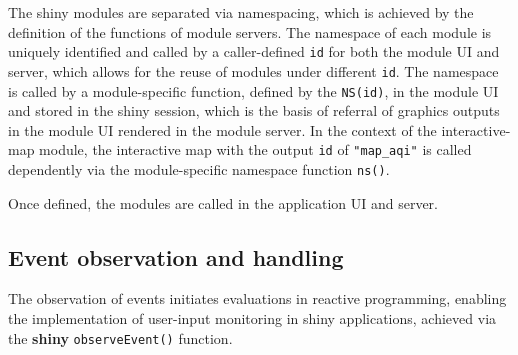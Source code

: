 \documentclass{aucklandthesis}
\begin{document}
The shiny modules are separated via namespacing, which is achieved by the definition of the functions of module servers. The namespace of each module is uniquely identified and called by a caller-defined \texttt{id} for both the module UI and server, which allows for the reuse of modules under different \texttt{id}. The namespace is called by a module-specific function, defined by the \texttt{NS(id)}, in the module UI and stored in the shiny session, which is the basis of referral of graphics outputs in the module UI rendered in the module server. In the context of the interactive-map module, the interactive map with the output \texttt{id} of \texttt{"map\_aqi"} is called dependently via the module-specific namespace function \texttt{ns()}.

Once defined, the modules are called in the application UI and server.

\begin{Shaded}
\begin{Highlighting}[]
\StringTok{ }
  \NormalTok{(}
\NormalTok{\}}

\StringTok{ }\NormalTok{(}
   \NormalTok{(}
      \NormalTok{(}\NormalTok{(}\NormalTok{(}\NormalTok{))),}
\NormalTok{    ),}
\NormalTok{  )}
\NormalTok{)}
\end{Highlighting}
\end{Shaded}

\hypertarget{sec:shiny-event}{%
\subsection{Event observation and handling}\label{sec:shiny-event}}

The observation of events initiates evaluations in reactive programming, enabling the implementation of user-input monitoring in shiny applications, achieved via the \textbf{shiny} \texttt{observeEvent()} function.
\end{document}
